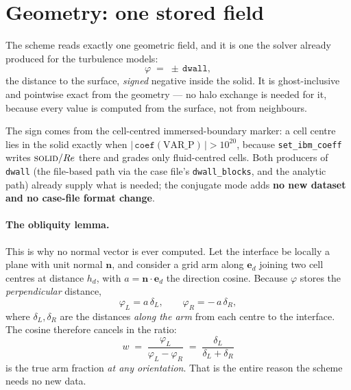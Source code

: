 \documentclass[11pt,a4paper]{article}
\newcommand{\ed}{\boldsymbol{e}_d}
\newcommand{\nn}{\boldsymbol{n}}
\newcommand{\code}[1]{\texttt{#1}}
\begin{document}
\section{Geometry: one stored field}
\label{sec:geometry}

The scheme reads exactly one geometric field, and it is one the solver already
produced for the turbulence models:
\begin{equation}
  \varphi \;=\; \pm\,\code{dwall},
  \label{eq:phi}
\end{equation}
the distance to the surface, \emph{signed} negative inside the solid. It is
ghost-inclusive and pointwise exact from the geometry --- no halo exchange is
needed for it, because every value is computed from the surface, not from
neighbours.

The sign comes from the cell-centred immersed-boundary marker: a cell centre
lies in the solid exactly when $|\,\code{coef}(\text{VAR\_P})\,| > 10^{20}$,
because \code{set\_ibm\_coeff} writes $\textsc{solid}/Re$ there and grades only
fluid-centred cells. Both producers of \code{dwall} (the file-based path via
the case file's \code{dwall\_blocks}, and the analytic path) already supply
what is needed; the conjugate mode adds \textbf{no new dataset and no
case-file format change}.

\paragraph{The obliquity lemma.}
This is why no normal vector is ever computed. Let the interface be locally a
plane with unit normal $\nn$, and consider a grid arm along $\ed$ joining two
cell centres at distance $h_d$, with $a = \nn\cdot\ed$ the direction cosine.
Because $\varphi$ stores the \emph{perpendicular} distance,
\[
  \varphi_L = a\,\delta_L, \qquad \varphi_R = -\,a\,\delta_R ,
\]
where $\delta_L,\delta_R$ are the distances \emph{along the arm} from each
centre to the interface. The cosine therefore cancels in the ratio:
\begin{equation}
  \boxed{\;
  w \;=\; \frac{\varphi_L}{\varphi_L-\varphi_R}
      \;=\; \frac{\delta_L}{\delta_L+\delta_R}\;}
  \label{eq:w}
\end{equation}
is the true arm fraction \emph{at any orientation}. That is the entire reason
the scheme needs no new data.
\end{document}
